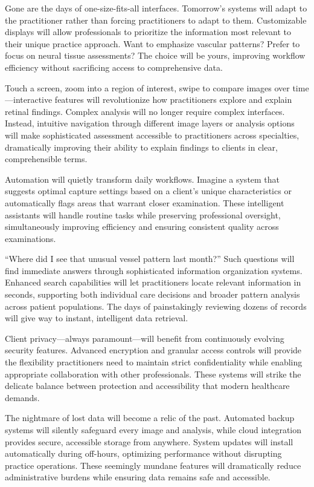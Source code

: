 \documentclass[
  Letterpaper,
]{scrbook}
\begin{document}
Gone are the days of one-size-fits-all interfaces. Tomorrow's systems
will adapt to the practitioner rather than forcing practitioners to
adapt to them. Customizable displays will allow professionals to
prioritize the information most relevant to their unique practice
approach. Want to emphasize vascular patterns? Prefer to focus on neural
tissue assessments? The choice will be yours, improving workflow
efficiency without sacrificing access to comprehensive data.

Touch a screen, zoom into a region of interest, swipe to compare images
over time---interactive features will revolutionize how practitioners
explore and explain retinal findings. Complex analysis will no longer
require complex interfaces. Instead, intuitive navigation through
different image layers or analysis options will make sophisticated
assessment accessible to practitioners across specialties, dramatically
improving their ability to explain findings to clients in clear,
comprehensible terms.

Automation will quietly transform daily workflows. Imagine a system that
suggests optimal capture settings based on a client's unique
characteristics or automatically flags areas that warrant closer
examination. These intelligent assistants will handle routine tasks
while preserving professional oversight, simultaneously improving
efficiency and ensuring consistent quality across examinations.

``Where did I see that unusual vessel pattern last month?'' Such
questions will find immediate answers through sophisticated information
organization systems. Enhanced search capabilities will let
practitioners locate relevant information in seconds, supporting both
individual care decisions and broader pattern analysis across patient
populations. The days of painstakingly reviewing dozens of records will
give way to instant, intelligent data retrieval.

Client privacy---always paramount---will benefit from continuously
evolving security features. Advanced encryption and granular access
controls will provide the flexibility practitioners need to maintain
strict confidentiality while enabling appropriate collaboration with
other professionals. These systems will strike the delicate balance
between protection and accessibility that modern healthcare demands.

The nightmare of lost data will become a relic of the past. Automated
backup systems will silently safeguard every image and analysis, while
cloud integration provides secure, accessible storage from anywhere.
System updates will install automatically during off-hours, optimizing
performance without disrupting practice operations. These seemingly
mundane features will dramatically reduce administrative burdens while
ensuring data remains safe and accessible.
\end{document}
